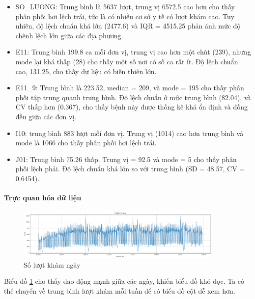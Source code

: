     \begin{itemize}
        \item SO\_LUONG: Trung bình là 5637 lượt, trung vị 6572.5 cao hơn cho thấy phân phối hơi lệch trái, tức là có nhiều cơ sở y tế có lượt khám cao. Tuy nhiên, độ lệch chuẩn khá lớn (2477.6) và IQR = 4515.25 phản ánh mức độ chênh lệch lớn giữa các địa phương. 
        
        \item E11: Trung bình 199.8 ca mỗi đơn vị, trung vị cao hơn một chút (239), nhưng mode lại khá thấp (28) cho thấy một số nơi có số ca rất ít. Độ lệch chuẩn cao, 131.25, cho thấy dữ liệu có biến thiên lớn.
        
        \item E11\_9: Trung bình là 223.52, median = 209, và mode = 195 cho thấy phân phối tập trung quanh trung bình. Độ lệch chuẩn ở mức trung bình (82.04), và CV thấp hơn (0.367), cho thấy bệnh này được thống kê khá ổn định và đồng đều giữa các đơn vị.
        
        \item I10: trung bình 883 lượt mỗi đơn vị. Trung vị (1014) cao hơn trung bình và mode là 1066 cho thấy phân phối hơi lệch trái. 
        
        \item J01: Trung bình 75.26 thấp. Trung vị = 92.5 và mode = 5 cho thấy phân phối lệch phải. Độ lệch chuẩn khá lớn so với trung bình (SD = 48.57, CV = 0.6454). 
    
    \end{itemize}

    \paragraph{Trực quan hóa dữ liệu}
    \leavevmode

    \begin{figure}[htp]
        \centering
        \includegraphics[width=0.90\textwidth]{images/TS_yte_tong.png}
        \caption{Số lượt khám ngày}
        \label{fig:TS_yte_tong}
    \end{figure}
    \FloatBarrier

    Biểu đồ \ref{fig:TS_yte_tong} cho thấy dao động mạnh giữa các ngày, khiến biểu đồ khó đọc. Ta có thể chuyển về trung bình lượt khám mỗi tuần để có biểu đồ cột dễ xem hơn.

